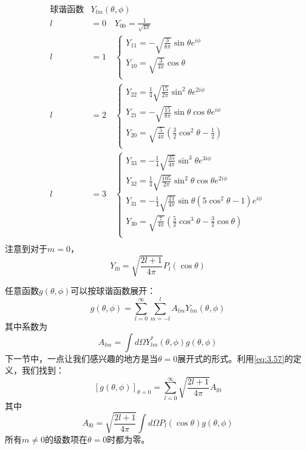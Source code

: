 \documentclass[12pt]{book}
\numberwithin{equation}{chapter}
\numberwithin{figure}{chapter}
\numberwithin{footnote}{page}
\begin{document}
$$\begin{aligned}
    \mbox{球谐函数}&Y_{lm}(\theta,\phi)\\
    l&=0 \quad Y_{00}=\frac{1}{\sqrt{4\pi}}\\
    l&=1 \quad 
    \begin{cases}
        Y_{11}=-\sqrt{\frac{3}{8\pi}}\sin\theta e^{i\phi}\\
        Y_{10}=\sqrt{\frac{3}{4\pi}}\cos\theta\\
    \end{cases}\\
    l&=2 \quad
    \begin{cases}
        Y_{22}=\frac{1}{4}\sqrt{\frac{15}{2\pi}}\sin^2\theta e^{2i\phi}\\
        Y_{21}=-\sqrt{\frac{15}{8\pi}}\sin\theta\cos\theta e^{i\phi}\\
        Y_{20}=\sqrt{\frac{5}{4\pi}}(\frac{3}{2}\cos^2\theta-\frac{1}{2})\\
    \end{cases}\\
    l&=3 \quad
    \begin{cases}
        Y_{33}=-\frac{1}{4}\sqrt{\frac{35}{4\pi}}\sin^3\theta e^{3i\phi}\\
        Y_{32}=\frac{1}{4}\sqrt{\frac{105}{2\pi}}\sin^2\theta\cos\theta e^{2i\phi}\\
        Y_{31}=-\frac{1}{4}\sqrt{\frac{21}{4\pi}}\sin\theta(5\cos^2\theta-1) e^{i\phi}\\
        Y_{30}=\sqrt{\frac{7}{4\pi}}(\frac{5}{2}\cos^3\theta-\frac{3}{2}\cos\theta)\\
    \end{cases}\\
\end{aligned}$$
注意到对于$m=0$，
\begin{equation}\label{eq:3.57}
    Y_{l0}=\sqrt{\frac{2l+1}{4\pi}}P_l(\cos\theta)
\end{equation}

任意函数$g(\theta,\phi)$可以按球谐函数展开：
\begin{equation}\label{eq:3.58}
    g(\theta,\phi)=\sum_{l=0}^\infty\sum_{m=-l}^l A_{lm}Y_{lm}(\theta,\phi)
\end{equation}
其中系数为
$$A_{lm}=\int d\Omega Y_{lm}^*(\theta,\phi)g(\theta,\phi)$$
下一节中，一点让我们感兴趣的地方是当$\theta=0$展开式的形式。利用\autoref{eq:3.57}的定义，我们找到：
\begin{equation}\label{eq:3.59}
    [g(\theta,\phi)]_{\theta=0}=\sum_{l=0}^\infty \sqrt{\frac{2l+1}{4\pi}}A_{l0}
\end{equation}
其中
\begin{equation}\label{eq:3.60}
    A_{l0}=\sqrt{\frac{2l+1}{4\pi}}\int d\Omega P_l(\cos\theta)g(\theta,\phi)
\end{equation}
所有$m\neq 0$的级数项在$\theta=0$时都为零。
\end{document}
